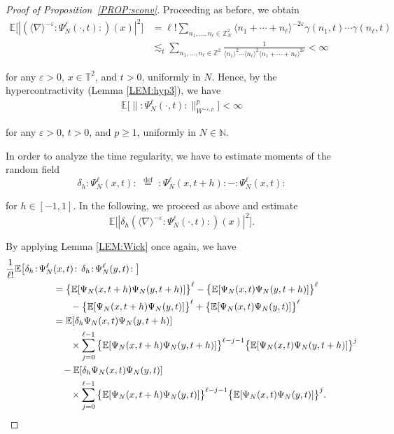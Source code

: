 \documentclass[letterpaper, 11pt,  reqno]{amsart}
\newcommand{\1}{\hspace{0.5mm}\text{I}\hspace{0.5mm}}
\newcommand{\noi}{\noindent}
\newcommand{\T}{\mathbb{T}}
\newcommand{\E}{\mathbb{E}}
\newcommand{\dl}{\delta}
\newcommand{\nb}{\nabla}
\newcommand{\eps}{\varepsilon}
\renewcommand{\l}{\ell}
\newcommand{\les}{\lesssim}
\newcommand{\jb}[1]
{\langle #1 \rangle}
\numberwithin{equation}{section}
\numberwithin{theorem}{section}
\begin{document}
\begin{proof}[Proof of Proposition~\ref{PROP:sconv}]
\noi
Proceeding as before, we obtain
\begin{align*}
\E\big[| (\jb{\nb}^{-\eps} :\! \Psi^{\l}_N (\cdot, t) \!:) (x) |^2 \big] 
& = \l! \sum_{n_1,
   \ldots, n_{\ell} \in \mathbb{Z}^2_N} \langle n_1 + \cdots + n_{\ell}\rangle^{-2\eps} 
   \gamma (n_1, t) \cdots \gamma (n_{\ell}, t) \\
& \les_t \sum_{n_1, \ldots, n_{\ell} \in \mathbb{Z}^2} \frac{1}{\langle n_1
   \rangle^2 \cdots \langle n_{\ell} \rangle^2 \langle n_1 + \cdots + n_{\ell}
   \rangle^{2\eps}} < \infty
\end{align*}


\noi
\noi
for any $\eps > 0$, $x \in \T^2$, and $t > 0$, 
uniformly in $N$.
Hence,  by the hypercontractivity (Lemma \ref{LEM:hyp3}), 
we have
\begin{align*}
\E\big[\|  :\! \Psi^{\l}_N (\cdot, t) \!:\|_{W^{-\eps, p}}^p \big] 
< \infty
\end{align*}

\noi
for any $\eps > 0$, $t > 0$,  and $p \geq 1$, uniformly in $N\in \mathbb{N}$. 





In order to analyze the time regularity, 
we have to estimate moments of the random field
\[\delta_h \! :\!\Psi^{\ell}_N (x, t) \!: \, \, \stackrel{\text{def}}{=}\,  \, : \!\Psi^{\ell}_N (x, t + h) \!: - :\! \Psi_N^{\ell} (x, t)\! :\] 

\noi
for $h \in [-1, 1]$.
In the following, we proceed as above and estimate
\[\mathbb{E} \big[|\dl_h (\jb{\nb}^{-\eps} : \! \Psi_N^{\ell} (\cdot, t ) \!:) (x) |^2 \big].\]

\noi 
By applying Lemma \ref{LEM:Wick} once again, we have
\begin{align*}
\frac{1}{\l!}\E \big[\delta_h \! :\! \Psi^{\ell}_N & (x, t) \!: \,  \delta_h\! :\! \Psi^{\ell}_N (y, t)\!:  \big]\notag\\
 & =  \big\{\mathbb{E} [\Psi_N (x, t + h) \Psi_N (y, t + h)]\big\}^\l 
    - \big\{\E [\Psi_N ( x, t) \Psi_N (y, t + h)]\big\}^\l \\
  & \hphantom{XX}
    - \big\{\E [\Psi_N (x, t + h) \Psi_N (y, t)]\big\}^\l 
+   \big\{\E [\Psi_N (x, t) \Psi_N (y, t)]\big\}^\l \nonumber\\
  & = \mathbb{E} [\dl_h \Psi_N ( x, t) \Psi_N (y, t + h)] \\
& \hphantom{XX}
\times   \sum_{j = 0}^{\l-1}    \big\{\mathbb{E} [ \Psi_N ( x, t+h) \Psi_N (y, t + h)]\big\}^{\l-j-1} 
   \big\{\mathbb{E} [ \Psi_N ( x, t) \Psi_N (y, t + h)]\big\}^j \\
& \hphantom{X}
- \mathbb{E} [\dl_h \Psi_N ( x, t) \Psi_N (y, t )] \\
& 
\hphantom{XX}
\times   \sum_{j = 0}^{\l-1}    \big\{\mathbb{E} [ \Psi_N ( x, t+h) \Psi_N (y, t )]\big\}^{\l-j-1} 
   \big\{\mathbb{E} [ \Psi_N ( x, t) \Psi_N (y, t )]\big\}^j .
\end{align*}




\end{proof}
\end{document}
